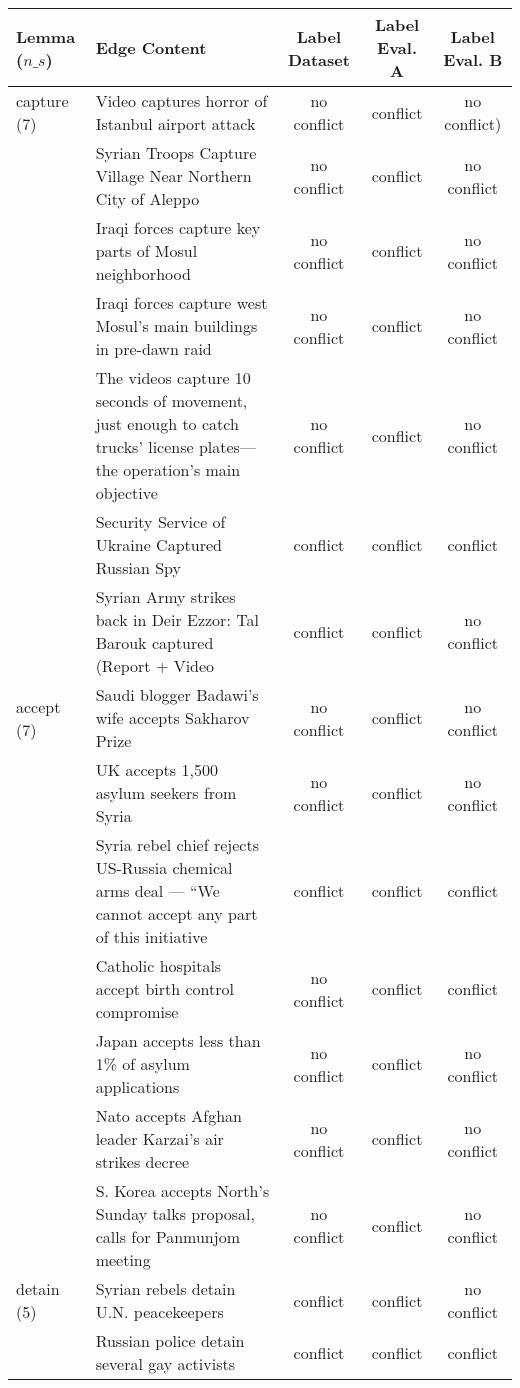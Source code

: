\begin{sidewaystable}[ht]
\centering
\begin{tabular}{l p{13cm} ccc}
\toprule
Lemma (\(n\_s\)) & Edge Content & Label Dataset & Label Eval. A & Label Eval. B \\
\midrule
capture (7) & Video captures horror of Istanbul airport attack & no conflict & conflict & no conflict) \\
& Syrian Troops Capture Village Near Northern City of Aleppo & no conflict & conflict & no conflict \\
& Iraqi forces capture key parts of Mosul neighborhood & no conflict & conflict & no conflict \\
& Iraqi forces capture west Mosul's main buildings in pre-dawn raid & no conflict & conflict & no conflict \\
& The videos capture 10 seconds of movement, just enough to catch trucks’ license plates—the operation’s main objective & no conflict & conflict & no conflict \\
& Security Service of Ukraine Captured Russian Spy & conflict & conflict & conflict \\
& Syrian Army strikes back in Deir Ezzor: Tal Barouk captured (Report + Video & conflict & conflict & no conflict \\
\hline
accept (7)
& Saudi blogger Badawi's wife accepts Sakharov Prize & no conflict & conflict & no conflict \\
& UK accepts 1,500 asylum seekers from Syria & no conflict & conflict & no conflict \\
& Syria rebel chief rejects US-Russia chemical arms deal — “We cannot accept any part of this initiative & conflict & conflict & conflict \\
& Catholic hospitals accept birth control compromise & no conflict & conflict & conflict \\
& Japan accepts less than 1\% of asylum applications & no conflict & conflict & no conflict \\
& Nato accepts Afghan leader Karzai's air strikes decree & no conflict & conflict & no conflict \\
& S. Korea accepts North's Sunday talks proposal, calls for Panmunjom meeting & no conflict & conflict & no conflict \\
\hline
detain (5)
& Syrian rebels detain U.N. peacekeepers & conflict & conflict & no conflict \\
& Russian police detain several gay activists & conflict & conflict & conflict \\

\end{tabular}
\end{sidewaystable}
